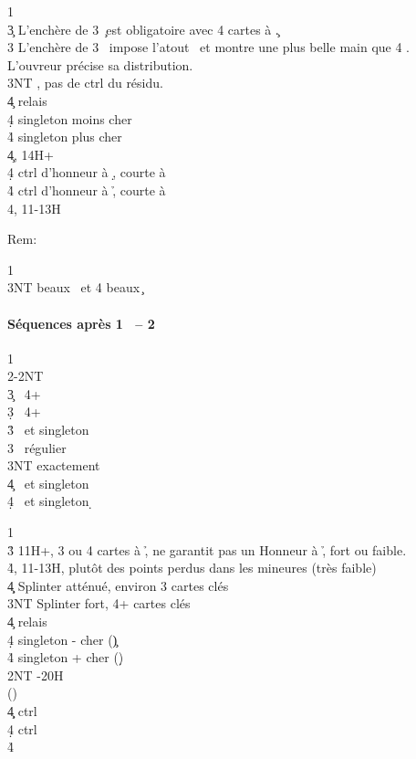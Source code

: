 \documentclass[a4paper]{article}
\begin{document}
\begin{bidtable}
1\c\\
3\c \> L’enchère de 3 \c\ est obligatoire avec 4 cartes à \c .\+\\
3\s \> L’enchère de 3 \s\ impose l’atout \s\ et montre une plus belle main que 4 \s .\\
\>L’ouvreur précise sa distribution.\+\\
3NT , pas de ctrl du résidu.\+\\
4\c \> relais\+\\
4\d \> singleton moins cher\\
4\h \> singleton plus cher\-\-\\
4\c {}, 14H+\\
4\d \> ctrl d’honneur à \d , courte à \h \\
4\h \> ctrl d’honneur à \h , courte à \d \\
4\s {}, 11-13H\-\-
\end{bidtable}

Rem:

\begin{bidtable}
1\c\\
3NT  beaux \s\ et 4 beaux \c 
\end{bidtable}

\paragraph{Séquences après 1 \pdfs\ – 2 \pdfh}

\begin{bidtable}
1\h\\
2\s-2NT\\
3\c {} \s\ 4+ \c \\
3\d {} \s\ 4+ \d \\
3\h {} \s\ et singleton \h \\
3\s {} \s\ régulier\\
3NT  exactement\\
4\c {} \s\ et singleton \c \\
4\d {} \s\ et singleton \d 
\end{bidtable}

\begin{bidtable}
1\h\\
3\h \> 11H+, 3 ou 4 cartes à \h , ne garantit pas un Honneur à \h , fort ou faible.\\
4\h {}, 11-13H, plutôt des points perdus dans les mineures (très faible)\\
4\c\d \> Splinter atténué, environ 3 cartes clés\\
3NT \> Splinter fort, 4+ cartes clés\+\\
4\c \> relais\+\\
4\d \> singleton - cher (\c )\\
4\h \> singleton + cher (\d )\-\-\\
2NT -20H\+\\
()\+\\
4\c\d {} ctrl \c \\
4\d {} ctrl \d \\
4\h {}\-\-
\end{bidtable}
\end{document}
